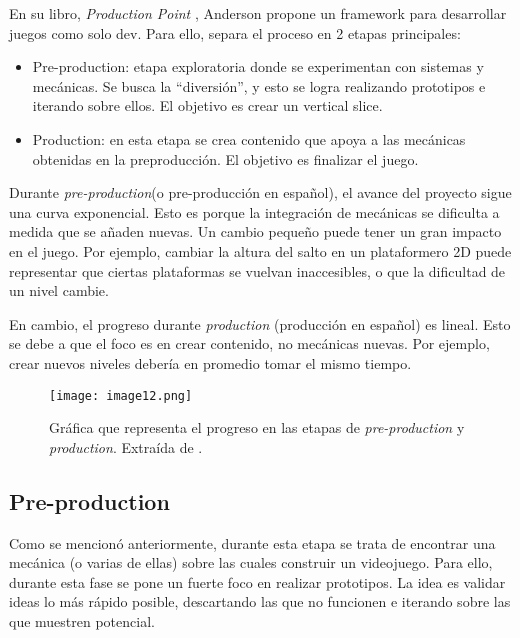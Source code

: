 \par En su libro, \textit{Production Point} \cite{andersonProductionPointHow2023}, Anderson propone un framework para desarrollar juegos como solo dev. Para ello, separa el proceso en 2 etapas principales:
\begin{itemize}
  \item Pre-production: etapa exploratoria donde se experimentan con sistemas y mecánicas. Se busca la “diversión”, y esto se logra realizando prototipos e iterando sobre ellos. El objetivo es crear un vertical slice.
  \item Production: en esta etapa se crea contenido que apoya a las mecánicas obtenidas  en la preproducción. El objetivo es finalizar el juego.
\end{itemize}
\par Durante \textit{pre-production}(o pre-producción en español), el avance del proyecto sigue una curva exponencial. Esto es porque la integración de mecánicas se dificulta a medida que se añaden nuevas.  Un cambio pequeño puede tener un gran impacto en el juego. Por ejemplo, cambiar la altura del salto en un plataformero 2D puede representar que ciertas plataformas se vuelvan inaccesibles, o que la dificultad de un nivel cambie.
\par En cambio, el progreso durante \textit{production} (producción en español) es lineal. Esto se debe a que el foco es en crear contenido, no mecánicas nuevas. Por ejemplo, crear nuevos niveles debería en promedio tomar el mismo tiempo.
\begin{figure}[H]
  \centering
  \texttt{[image: image12.png]}
  \caption{Gráfica que representa el progreso en las etapas de \textit{pre-production} y \textit{production}. Extraída de \cite{andersonProductionPointHow2023}.}
  \label{fig:x progreso de etapas Anderson}
\end{figure}
%
%
\subsection{Pre-production}
\par Como se mencionó anteriormente, durante esta etapa se trata de encontrar una mecánica (o varias de ellas) sobre las cuales construir un videojuego. Para ello, durante esta fase se pone un fuerte foco en realizar prototipos. La idea es validar ideas lo más rápido posible, descartando las que no funcionen e iterando sobre las que muestren potencial.
%
